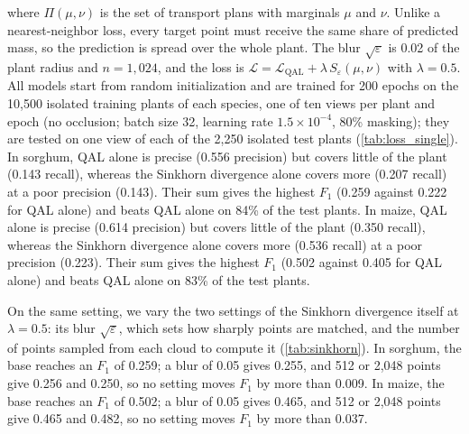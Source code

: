 \documentclass[10pt,twocolumn,letterpaper]{article}
\begin{document}
where $\Pi(\mu,\nu)$ is the set of transport plans with marginals $\mu$ and $\nu$. Unlike a nearest-neighbor loss, every
target point must receive the same share of predicted mass, so the prediction is spread over the whole plant. The blur
$\sqrt{\varepsilon}$ is 0.02 of the plant radius and $n = 1{,}024$, and the loss is
$\mathcal{L} = \mathcal{L}_{\mathrm{QAL}} + \lambda\,S_\varepsilon(\mu,\nu)$ with $\lambda = 0.5$. All models start from random
initialization and are trained for 200 epochs on the 10{,}500 isolated training plants of each species, one of ten views
per plant and epoch (no occlusion; batch size 32, learning rate $1.5\times10^{-4}$, 80\% masking); they are tested on one
view of each of the 2{,}250 isolated test plants (\cref{tab:loss_single}). In sorghum, QAL alone is precise (0.556 precision) but covers little of the plant (0.143 recall), whereas the Sinkhorn divergence alone covers more (0.207 recall) at a poor precision (0.143). Their sum gives the highest $F_1$ (0.259 against 0.222 for QAL alone) and beats QAL alone on 84\% of the test plants. In maize, QAL alone is precise (0.614 precision) but covers little of the plant (0.350 recall), whereas the Sinkhorn divergence alone covers more (0.536 recall) at a poor precision (0.223). Their sum gives the highest $F_1$ (0.502 against 0.405 for QAL alone) and beats QAL alone on 83\% of the test plants.

On the same setting, we vary the two settings of the Sinkhorn divergence itself at $\lambda = 0.5$: its blur
$\sqrt{\varepsilon}$, which sets how sharply points are matched, and the number of points sampled from each cloud to
compute it (\cref{tab:sinkhorn}).
In sorghum, the base reaches an $F_1$ of 0.259; a blur of 0.05 gives 0.255, and 512 or 2{,}048 points give 0.256 and 0.250, so no setting moves $F_1$ by more than 0.009. In maize, the base reaches an $F_1$ of 0.502; a blur of 0.05 gives 0.465, and 512 or 2{,}048 points give 0.465 and 0.482, so no setting moves $F_1$ by more than 0.037.
\end{document}
